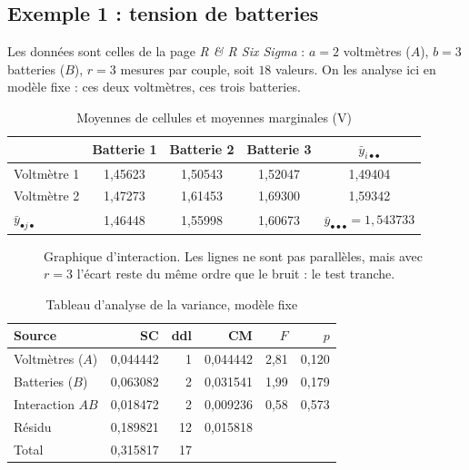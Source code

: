 \documentclass[11pt,a4paper]{article}
\theoremstyle{sj}
\theoremstyle{definition}
\theoremstyle{remark}
\newcommand{\ybar}{\bar y}
\newcommand{\dotp}{{\scriptscriptstyle\bullet}}
\begin{document}
\subsection{Exemple 1 : tension de batteries}\label{sec:ex1}

Les données sont celles de la page \emph{R \& R Six Sigma} : $a=2$ voltmètres ($A$), $b=3$ batteries ($B$), $r=3$ mesures par couple, soit $18$ valeurs. On les analyse ici en modèle fixe : ces deux voltmètres, ces trois batteries.

\begin{table}[h]
\centering
\caption{Moyennes de cellules et moyennes marginales (V)}
\begin{tabular}{l c c c c}
\toprule
& Batterie 1 & Batterie 2 & Batterie 3 & $\ybar_{i\dotp\dotp}$\\
\midrule
Voltmètre 1 & 1,45623 & 1,50543 & 1,52047 & 1,49404\\
Voltmètre 2 & 1,47273 & 1,61453 & 1,69300 & 1,59342\\
\midrule
$\ybar_{\dotp j\dotp}$ & 1,46448 & 1,55998 & 1,60673 & $\ybar_{\dotp\dotp\dotp}=1{,}543733$\\
\bottomrule
\end{tabular}
\end{table}

\begin{figure}[h]
\centering
{}
\caption{Graphique d'interaction. Les lignes ne sont pas parallèles, mais avec $r=3$ l'écart reste du même ordre que le bruit : le test tranche.}
\end{figure}

\begin{table}[h]
\centering
\caption{Tableau d'analyse de la variance, modèle fixe}
\begin{tabular}{l r r r r r}
\toprule
Source & SC & ddl & CM & $F$ & $p$\\
\midrule
Voltmètres ($A$) & 0,044442 & 1 & 0,044442 & 2,81 & 0,120\\
Batteries ($B$) & 0,063082 & 2 & 0,031541 & 1,99 & 0,179\\
Interaction $AB$ & 0,018472 & 2 & 0,009236 & 0,58 & 0,573\\
Résidu & 0,189821 & 12 & 0,015818 & &\\
\midrule
Total & 0,315817 & 17 & & &\\
\bottomrule
\end{tabular}
\end{table}
\end{document}
